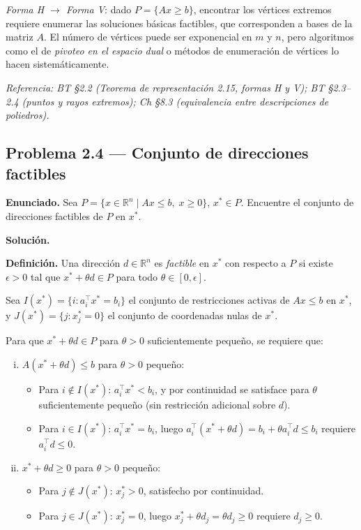 \documentclass{article}
\begin{document}
\textit{Forma H $\to$ Forma V}: dado $P = \{Ax \geq b\}$, encontrar los vértices extremos requiere enumerar las soluciones básicas factibles, que corresponden a bases de la matriz $A$. El número de vértices puede ser exponencial en $m$ y $n$, pero algoritmos como el de \emph{pivoteo en el espacio dual} o métodos de enumeración de vértices lo hacen sistemáticamente.

\medskip
\noindent\textit{Referencia: BT §2.2 (Teorema de representación 2.15, formas H y V); BT §2.3--2.4 (puntos y rayos extremos); Ch §8.3 (equivalencia entre descripciones de poliedros).}

\newpage
\subsection*{Problema 2.4 — Conjunto de direcciones factibles}

\textbf{Enunciado.} Sea $P = \{x \in \mathbb{R}^n \mid Ax \leq b,\; x \geq 0\}$, $x^* \in P$. Encuentre el conjunto de direcciones factibles de $P$ en $x^*$.

\medskip
\noindent\textbf{Solución.}

\noindent\textbf{Definición.} Una dirección $d \in \mathbb{R}^n$ es \emph{factible} en $x^*$ con respecto a $P$ si existe $\epsilon > 0$ tal que $x^* + \theta d \in P$ para todo $\theta \in [0, \epsilon]$.

Sea $I(x^*) = \{i : a_i^\top x^* = b_i\}$ el conjunto de restricciones activas de $Ax \leq b$ en $x^*$, y $J(x^*) = \{j : x^*_j = 0\}$ el conjunto de coordenadas nulas de $x^*$.

Para que $x^* + \theta d \in P$ para $\theta > 0$ suficientemente pequeño, se requiere que:
\begin{enumerate}[(i)]
\item $A(x^* + \theta d) \leq b$ para $\theta > 0$ pequeño:
  \begin{itemize}
  \item Para $i \notin I(x^*)$: $a_i^\top x^* < b_i$, y por continuidad se satisface para $\theta$ suficientemente pequeño (sin restricción adicional sobre $d$).
  \item Para $i \in I(x^*)$: $a_i^\top x^* = b_i$, luego $a_i^\top(x^* + \theta d) = b_i + \theta a_i^\top d \leq b_i$ requiere $a_i^\top d \leq 0$.
  \end{itemize}
\item $x^* + \theta d \geq 0$ para $\theta > 0$ pequeño:
  \begin{itemize}
  \item Para $j \notin J(x^*)$: $x^*_j > 0$, satisfecho por continuidad.
  \item Para $j \in J(x^*)$: $x^*_j = 0$, luego $x^*_j + \theta d_j = \theta d_j \geq 0$ requiere $d_j \geq 0$.
  \end{itemize}
\end{enumerate}
\end{document}
